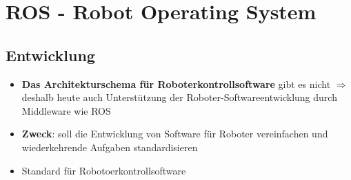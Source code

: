 \section{ROS - Robot Operating System}
\subsection{Entwicklung}
\begin{itemize}
	\item \textbf{Das Architekturschema für Roboterkontrollsoftware} gibt es nicht $\Rightarrow$ deshalb heute auch Unterstützung der Roboter-Softwareentwicklung durch Middleware wie ROS
	\item \textbf{Zweck}: soll die Entwicklung von Software für Roboter vereinfachen und wiederkehrende Aufgaben standardisieren
	\item Standard für Robotoerkontrollsoftware
\end{itemize}
